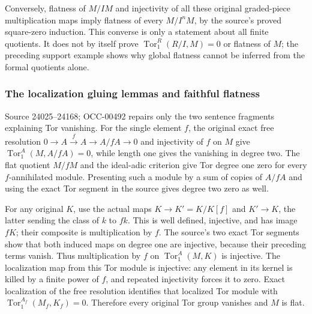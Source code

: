 Conversely, flatness of \(M/IM\) and injectivity of all these original graded-piece multiplication maps imply flatness of every \(M/I^nM\), by the source's proved square-zero induction. This converse is only a statement about all finite quotients. It does not by itself prove \(\operatorname{Tor}_1^R(R/I,M)=0\) or flatness of \(M\); the preceding support example shows why global flatness cannot be inferred from the formal quotients alone.

\subsubsection{The localization gluing lemmas and faithful flatness}\label{algebra-proof-016-the-localization-gluing-lemmas-and-faithful-flatness}

Source 24025--24168; OCC-00492 repairs only the two sentence fragments explaining Tor vanishing. For the single element \(f\), the original exact free resolution \(0\to A\xrightarrow{f}A\to A/fA\to0\) and injectivity of \(f\) on \(M\) give \(\operatorname{Tor}_1^A(M,A/fA)=0\), while length one gives the vanishing in degree two. The flat quotient \(M/fM\) and the ideal-adic criterion give Tor degree one zero for every \(f\)-annihilated module. Presenting such a module by a sum of copies of \(A/fA\) and using the exact Tor segment in the source gives degree two zero as well.

For any original \(K\), use the actual maps \(K\to K'=K/K[f]\) and \(K'\to K\), the latter sending the class of \(k\) to \(fk\). This is well defined, injective, and has image \(fK\); their composite is multiplication by \(f\). The source's two exact Tor segments show that both induced maps on degree one are injective, because their preceding terms vanish. Thus multiplication by \(f\) on \(\operatorname{Tor}_1^A(M,K)\) is injective. The localization map from this Tor module is injective: any element in its kernel is killed by a finite power of \(f\), and repeated injectivity forces it to zero. Exact localization of the free resolution identifies that localized Tor module with \(\operatorname{Tor}_1^{A_f}(M_f,K_f)=0\). Therefore every original Tor group vanishes and \(M\) is flat.

